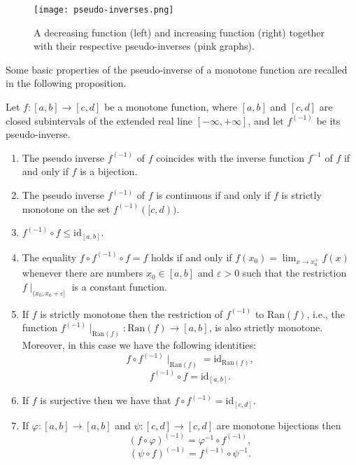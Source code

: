 \begin{figure}
\centering
\texttt{[image: pseudo-inverses.png]}
\caption{A decreasing function (left) and increasing function (right) together with their respective pseudo-inverses (pink graphs).}\label{fig:pseudo-inverses}
\end{figure}


Some basic properties of the pseudo-inverse of a monotone function are recalled in the following proposition.

\begin{proposition}\label{prop:pseudo-inverse}
Let $f:[a,b] \rightarrow [c,d]$ be a monotone function, where $[a,b]$ and $[c,d]$ are closed subintervals of the extended real line $[-\infty,+\infty]$, and let $f^{(-1)}$ be its pseudo-inverse.
	\begin{enumerate}[label=(\roman*)]
		\item  The pseudo inverse $f^{(-1)}$ of $f$ coincides with the inverse function $f^{-1}$ of $f$ if and only if $f$ is a bijection.
		\item The pseudo inverse $f^{(-1)}$ of $f$ is continuous if and only if $f$ is strictly monotone on the set $f^{(-1)}([c,d))$.
		\item $f^{(-1)} \circ f \leq \text{id}_{[a,b]}$.
		\item The equality $f \circ f^{(-1)} \circ f = f$ holds if and only if $\displaystyle f(x_0)=\lim_{x \to x_0^{+}} f(x)$ whenever there are numbers $x_0 \in [a,b]$ and $\varepsilon >0$ such that the restriction $f\mid_{(x_0,x_0+\varepsilon]}$ is a constant function.
		\item If $f$ is strictly monotone then the restriction of $f^{(-1)}$ to Ran$(f)$, i.e., the function $f^{(-1)}\mid_{\text{Ran}(f)} : \text{Ran}(f) \rightarrow [a,b]$, is also strictly monotone. Moreover, in this case we have the following identities:
		$$ f \circ f^{(-1)} \mid_{\text{Ran}(f)} = \text{id}_{\text{Ran}(f)},$$
		$$f^{(-1)} \circ f = \text{id}_{[a,b]}.$$
		\item If $f$ is surjective then we have that $f \circ f^{(-1)} = \text{id}_{[c,d]}$.
		\item If $\varphi:[a,b] \rightarrow [a,b]$ and $\psi : [c,d] \rightarrow [c,d]$ are monotone bijections then
		$$(f \circ \varphi)^{(-1)} = \varphi^{-1} \circ f^{(-1)},$$
		$$(\psi \circ f)^{(-1)} = f^{(-1)} \circ \psi^{-1}.$$
	\end{enumerate}
\end{proposition}

